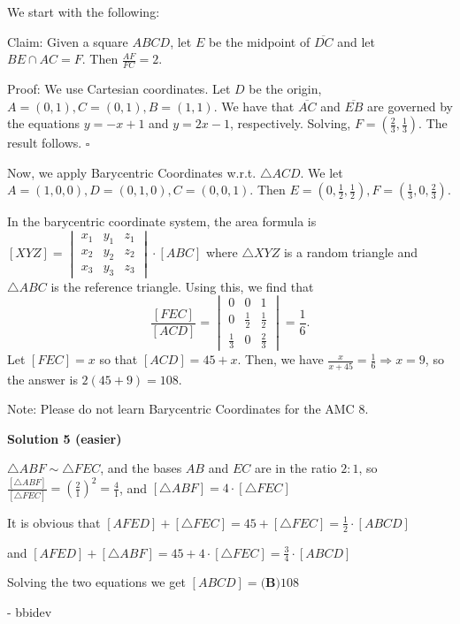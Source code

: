 \begin{enumerate}
 We start with the following:

 Claim: Given a square $ABCD$, let $E$ be the midpoint of $\overline{DC}$ and let $BE\cap AC = F$. Then $\frac {AF}{FC}=2$.

 Proof: We use Cartesian coordinates. Let $D$ be the origin, $A=(0,1),C=(0,1),B=(1,1)$. We have that $\overline{AC}$ and $\overline{EB}$ are governed by the equations $y=-x+1$ and $y=2x-1$, respectively. Solving, $F=\left(\frac{2}{3},\frac{1}{3}\right)$. The result follows. $\square$

 Now, we apply Barycentric Coordinates w.r.t. $\triangle ACD$. We let $A=(1,0,0),D=(0,1,0),C=(0,0,1)$. Then $E=(0,\frac 12,\frac 12),F=(\frac 13,0,\frac 23)$. 

 In the barycentric coordinate system, the area formula is $[XYZ]=\begin{vmatrix} x_{1} &y_{1}  &z_{1} \\ x_{2} &y_{2}  &z_{2} \\   x_{3}& y_{3} & z_{3} \end{vmatrix}\cdot [ABC]$ where $\triangle XYZ$ is a random triangle and $\triangle ABC$ is the reference triangle. Using this, we find that
 \[\frac{[FEC]}{[ACD]}=\begin{vmatrix} 0&0&1\\ 0&\frac 12&\frac 12\\ \frac 13&0&\frac 23 \end{vmatrix}=\frac16.\] Let $[FEC]=x$ so that $[ACD]=45+x$. Then, we have $\frac{x}{x+45}=\frac 16 \Rightarrow x=9$, so the answer is $2(45+9)=\boxed{108}$.

 Note: Please do not learn Barycentric Coordinates for the AMC 8.

 



\textbf{Solution 5 (easier)}

$\triangle ABF \sim \triangle FEC$, and the bases $AB$ and $EC$ are in the ratio $2:1$, so $\frac{[\triangle ABF]}{[\triangle FEC]}=\left(\frac{2}{1}\right)^2=\frac{4}{1}$, and $[\triangle ABF]=4\cdot[\triangle FEC]$

 It is obvious that $[AFED]+[\triangle FEC]=45+[\triangle FEC]=\frac{1}{2}\cdot[ABCD]$

 and $[AFED]+[\triangle ABF]=45+4\cdot[\triangle FEC]=\frac{3}{4}\cdot[ABCD]$

 Solving the two equations we get $[ABCD]=\boxed{\textbf{(B)}108}$

 - bbidev

 




\end{enumerate}
